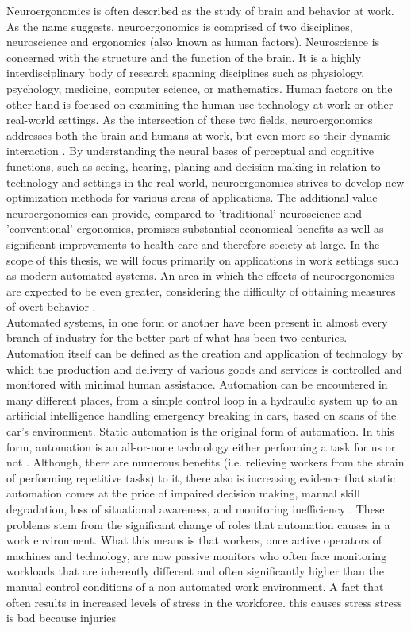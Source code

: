 
Neuroergonomics is often described as the study of brain and behavior at work. As the name suggests, neuroergonomics is comprised of two disciplines, neuroscience and ergonomics (also known as human factors). Neuroscience is concerned with the structure and the function of the brain. It is a highly interdisciplinary body of research spanning disciplines such as physiology, psychology, medicine, computer science, or mathematics. Human factors on the other hand is focused on examining the human use technology at work or other real-world settings. As the intersection of these two fields, neuroergonomics addresses both the brain and humans at work, but even more so their dynamic interaction \cite{Parasuraman2003}
. By understanding the neural bases of perceptual and cognitive functions, such as seeing, hearing, planing and decision making in relation to technology and settings in the real world, neuroergonomics strives to develop new optimization methods for various areas of applications. The additional value neuroergonomics can provide, compared to 'traditional' neuroscience and 'conventional' ergonomics, promises substantial economical benefits as well as significant improvements to health care and therefore society at large. 
In the scope of this thesis, we will focus primarily on applications in work settings such as modern automated systems. An area in which the effects of neuroergonomics are expected to be even greater, considering the difficulty of obtaining measures of overt behavior \cite{Parasuraman2003}.\\
Automated systems, in one form or another have been present in almost every branch of industry for the better part of what has been two centuries. Automation itself can be defined as the creation and application of technology by which the production and delivery of various goods and services is controlled and monitored with minimal human assistance. Automation can be encountered in many different places, from a simple control loop in a hydraulic system up to an artificial intelligence handling emergency breaking in cars, based on scans of the car's environment. 
Static automation is the original form of automation. In this form, automation is an all-or-none technology either performing a task for us or not \cite{Byrne2006}.
Although, there are numerous benefits (i.e. relieving workers from the strain of performing repetitive tasks) to it, there also is increasing evidence that static automation comes at the price of impaired decision making, manual skill degradation, loss of situational awareness, and monitoring inefficiency \cite{Byrne2006}.
These problems stem from the significant change of roles that automation causes in a work environment. What this means is that workers, once active operators of machines and technology, are now passive monitors who often face monitoring workloads that are inherently different and often significantly higher than the manual control conditions of a non automated work environment.
A fact that often results in increased levels of stress in the workforce. 
this causes stress
stress is bad because injuries

